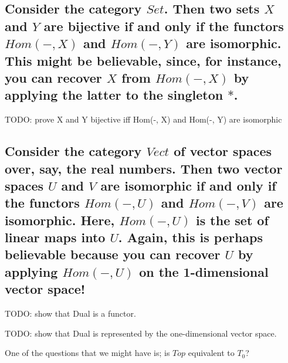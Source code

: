 \documentclass{proc-l}
\theoremstyle{definition}
\theoremstyle{remark}
\numberwithin{equation}{section}
\begin{document}
\subsection*{Consider the category $Set$. Then two sets $X$ and $Y$ are bijective if and only if the functors $Hom(-,X)$ and $Hom(-,Y)$ are isomorphic. This might be believable, since, for instance, you can recover $X$ from $Hom(-,X)$ by applying the latter to the singleton ${*}$.}

TODO: prove X and Y bijective iff Hom(-, X) and Hom(-, Y) are isomorphic









\subsection*{Consider the category $Vect$ of vector spaces over, say, the real numbers. Then two vector spaces $U$ and $V$ are isomorphic if and only if the functors $Hom(-,U)$ and $Hom(-,V)$ are isomorphic. Here, $Hom(-,U)$ is the set of linear maps into $U$. Again, this is perhaps believable because you can recover $U$ by applying $Hom(-,U)$ on the 1-dimensional vector space!}


TODO: show that Dual is a functor.

TODO: show that Dual is represented by the one-dimensional vector space.

One of the questions that we might have is; is $Top$ equivalent to $T_0$? 
\end{document}
